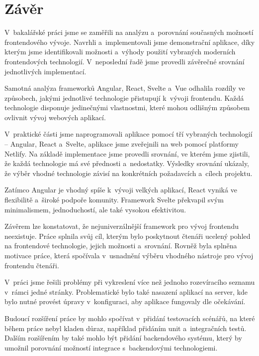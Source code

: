 \section*{Závěr}

V~bakalářské práci jsme se zaměřili na analýzu a~porovnání současných možností frontendového vývoje. 
Navrhli a~implementovali jsme demonstrační aplikace, díky kterým jsme identifikovali možnosti a~výhody použití vybraných moderních frontendových technologií. 
V~neposlední řadě jsme provedli závěrečné srovnání jednotlivých implementací.

Samotná analýza frameworků Angular, React, Svelte a~Vue odhalila rozdíly ve způsobech, jakými jednotlivé technologie přistupují k~vývoji frontendu. 
Každá technologie disponuje jedinečnými vlastnostmi, které mohou odlišným způsobem ovlivnit vývoj webových aplikací. 

V~praktické části jsme naprogramovali aplikace pomocí tří vybraných technologií -- Angular, React a~Svelte, aplikace jsme zveřejnili na web pomocí platformy Netlify. 
Na základě implementace jsme provedli srovnání, ve kterém jsme zjistili, že každá technologie má své přednosti a~nedostatky. 
Výsledky srovnání ukázaly, že výběr vhodné technologie závisí na konkrétních požadavcích a~cílech projektu.

Zatímco Angular je vhodný spíše k~vývoji velkých aplikací, React vyniká ve flexibilitě a~široké podpoře komunity. 
Framework Svelte překvapil svým minimalismem, jednoduchostí, ale také vysokou efektivitou.

Závěrem lze konstatovat, že nejuniverzálnější framework pro vývoj frontendu neexistuje. 
Práce splnila svůj cíl, kterým bylo poskytnout čtenáři ucelený pohled na frontendové technologie, jejich možnosti a~srovnání.
Rovněž byla splněna motivace práce, která spočívala v~usnadnění výběru vhodného nástroje pro vývoj frontendu čtenáři.

V~práci jsme řešili problémy při vykreslení více než jednoho rozevíracího seznamu v~rámci jedné stránky. 
Problematické bylo také nasazení aplikací na server, kde bylo nutné provést úpravy v~konfiguraci, aby aplikace fungovaly dle očekávání.

Budoucí rozšíření práce by mohlo spočívat v~přidání testovacích scénářů, na které během práce nebyl kladen důraz, například přidáním unit a~integračních testů.
Dalším rozšířením by také mohlo být přidání backendového systému, který by umožnil porovnání možností integrace s~backendovými technologiemi.

